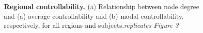\begin{figure}
 \caption{\textbf{Regional controllability.} (a) Relationship between node degree  and (a) average controllability and (b) modal controllability, respectively, 
 for all regions and subjects.\textit{replicates Figure 3}} 
 \label{fig:controllability-measures}
\end{figure}

